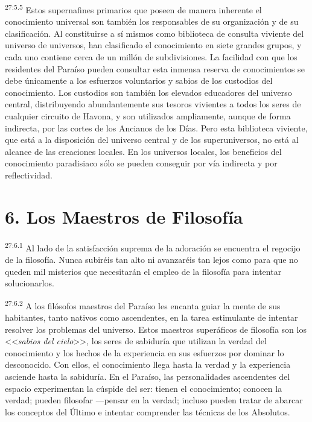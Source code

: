 \par
\textsuperscript{27:5.5} Estos supernafines primarios que poseen de manera inherente el conocimiento universal son también los responsables de su organización y de su clasificación. Al constituirse a sí mismos como biblioteca de consulta viviente del universo de universos, han clasificado el conocimiento en siete grandes grupos, y cada uno contiene cerca de un millón de subdivisiones. La facilidad con que los residentes del Paraíso pueden consultar esta inmensa reserva de conocimientos se debe únicamente a los esfuerzos voluntarios y sabios de los custodios del conocimiento. Los custodios son también los elevados educadores del universo central, distribuyendo abundantemente sus tesoros vivientes a todos los seres de cualquier circuito de Havona, y son utilizados ampliamente, aunque de forma indirecta, por las cortes de los Ancianos de los Días. Pero esta biblioteca viviente, que está a la disposición del universo central y de los superuniversos, no está al alcance de las creaciones locales. En los universos locales, los beneficios del conocimiento paradisiaco sólo se pueden conseguir por vía indirecta y por reflectividad.

\section*{6. Los Maestros de Filosofía}
\par
\textsuperscript{27:6.1} Al lado de la satisfacción suprema de la adoración se encuentra el regocijo de la filosofía. Nunca subiréis tan alto ni avanzaréis tan lejos como para que no queden mil misterios que necesitarán el empleo de la filosofía para intentar solucionarlos.

\par
\textsuperscript{27:6.2} A los filósofos maestros del Paraíso les encanta guiar la mente de sus habitantes, tanto nativos como ascendentes, en la tarea estimulante de intentar resolver los problemas del universo. Estos maestros superáficos de filosofía son los <<\textit{sabios del cielo}>>, los seres de sabiduría que utilizan la verdad del conocimiento y los hechos de la experiencia en sus esfuerzos por dominar lo desconocido. Con ellos, el conocimiento llega hasta la verdad y la experiencia asciende hasta la sabiduría. En el Paraíso, las personalidades ascendentes del espacio experimentan la cúspide del ser: tienen el conocimiento; conocen la verdad; pueden filosofar ---pensar en la verdad; incluso pueden tratar de abarcar los conceptos del Último e intentar comprender las técnicas de los Absolutos.

